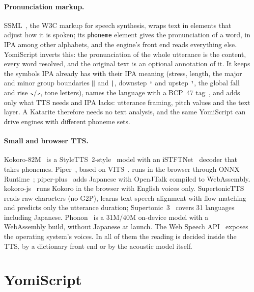 \documentclass[11pt,a4paper]{article}
\newcommand{\ys}[1]{\mbox{\texttt{#1}}}
\begin{document}
\paragraph{Pronunciation markup.} SSML~\citep{ssml11}, the W3C markup for speech synthesis, wraps text in elements
that adjust how it is spoken; its \texttt{phoneme} element gives the pronunciation of a word, in IPA among other
alphabets, and the engine's front end reads everything else. YomiScript inverts this: the pronunciation of the whole
utterance is the content, every word resolved, and the original text is an optional annotation of it. It keeps the
symbols IPA already has with their IPA meaning (stress, length, the major and minor group boundaries \ys{‖}
and \ys{|}, downstep \ys{ꜜ} and upstep \ys{ꜛ}, the global fall and rise \ys{↘}/\ys{↗}, tone letters), names the
language with a BCP~47 tag~\citep{rfc5646}, and adds only what TTS needs and IPA lacks: utterance framing, pitch
values and the text layer. A Katarite therefore needs no text analysis, and the same YomiScript can drive engines
with different phoneme sets.

\paragraph{Small and browser TTS.} Kokoro-82M~\citep{kokoro82m} is a StyleTTS~2-style~\citep{li2023styletts2} model with
an iSTFTNet~\citep{kaneko2022istftnet} decoder that takes phonemes. Piper~\citep{piper}, based on VITS~\citep{kim2021vits},
runs in the browser through ONNX Runtime~\citep{onnxruntime}; piper-plus~\citep{piperplus} adds Japanese with OpenJTalk
compiled to WebAssembly. kokoro-js~\citep{kokorojs} runs Kokoro in the browser with English voices only.
SupertonicTTS~\citep{kim2025supertonic} reads raw characters (no G2P), learns text-speech alignment with flow
matching~\citep{lipman2023flow} and predicts only the utterance duration; Supertonic~3~\citep{supertonic3} covers 31
languages including Japanese. Phonon~\citep{phonon} is a 31M/40M on-device model with a WebAssembly build, without
Japanese at launch. The Web Speech API~\citep{webspeech} exposes the operating system's voices. In all of them the
reading is decided inside the TTS, by a dictionary front end or by the acoustic model itself.

\section{YomiScript}\label{sec:yomiscript}
\end{document}
